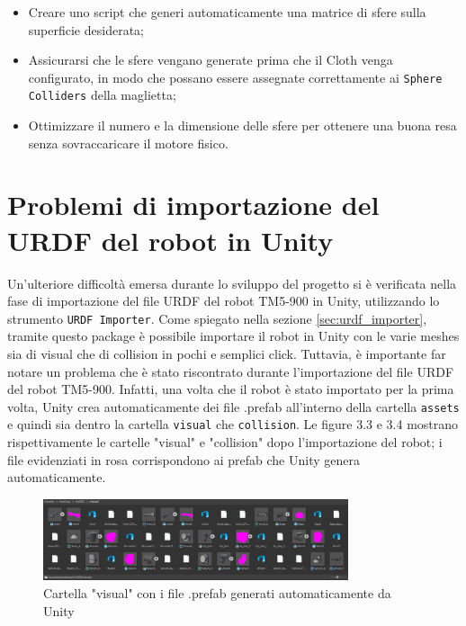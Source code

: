 \documentclass[11pt]{report}
\begin{document}
\begin{itemize}
    \item Creare uno script che generi automaticamente una matrice di sfere sulla superficie desiderata;
    \item Assicurarsi che le sfere vengano generate prima che il Cloth venga configurato, in modo che possano essere assegnate correttamente ai \texttt{Sphere Colliders} della maglietta;
    \item Ottimizzare il numero e la dimensione delle sfere per ottenere una buona resa senza sovraccaricare il motore fisico.
\end{itemize}

\section{Problemi di importazione del URDF del robot in Unity}
\label{sec:Problemi_importazione_URDF}
Un'ulteriore difficoltà emersa durante lo sviluppo del progetto si è verificata nella fase di importazione del file URDF del robot TM5-900 in Unity, utilizzando lo strumento \texttt{URDF Importer}. Come spiegato nella sezione \ref{sec:urdf_importer}, tramite questo package è possibile importare il robot in Unity con le varie meshes sia di visual che di collision in pochi e semplici click. Tuttavia, è importante far notare un problema che è stato riscontrato durante l'importazione del file URDF del robot TM5-900. Infatti, una volta che il robot è stato importato per la prima volta, Unity crea automaticamente dei file .prefab all'interno della cartella \texttt{assets} e quindi sia dentro la cartella \texttt{visual} che \texttt{collision}. Le figure 3.3 e 3.4 mostrano rispettivamente le cartelle "visual" e "collision" dopo l'importazione del robot; i file evidenziati in rosa corrispondono ai prefab che Unity genera automaticamente.

\begin{figure} [H]
    \centering
    \includegraphics[width=0.8\textwidth]{images/prefab_visual.PNG}
    \caption{Cartella "visual" con i file .prefab generati automaticamente da Unity}
    \label{fig:visual_prefab}
\end{figure}
\end{document}
